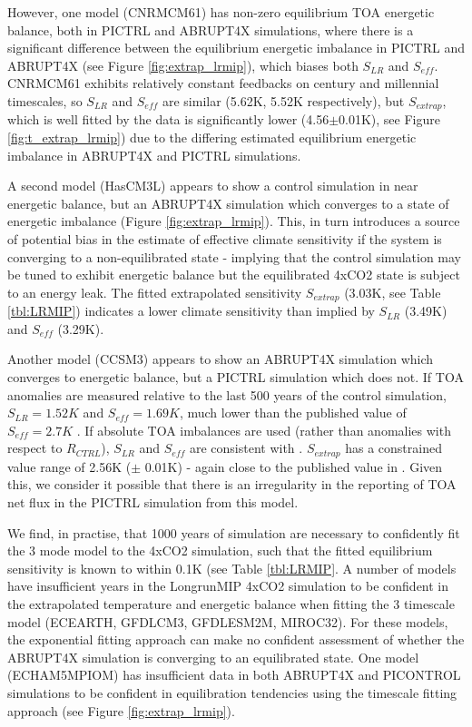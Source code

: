 \documentclass[esd, article]{copernicus}
\begin{document}
However, one model (CNRMCM61) has non-zero equilibrium TOA energetic balance, both in PICTRL and ABRUPT4X simulations, where there is a significant difference between the equilibrium energetic imbalance in PICTRL and ABRUPT4X (see Figure \ref{fig:extrap_lrmip}), which biases both $S_{LR}$ and $S_{eff}$.  CNRMCM61 exhibits relatively constant feedbacks on century and millennial timescales, so $S_{LR}$ and $S_{eff}$ are similar (5.62K, 5.52K respectively), but $S_{extrap}$, which is well fitted by the data is significantly lower (4.56$\pm$0.01K), see Figure \ref{fig:t_extrap_lrmip}) due to the differing estimated equilibrium energetic imbalance in ABRUPT4X and PICTRL simulations.  

A second model (HasCM3L) appears to show a control simulation in near energetic balance, but an ABRUPT4X simulation which converges to a state of energetic imbalance (Figure \ref{fig:extrap_lrmip}).  This, in turn introduces a source of potential bias in the estimate of effective climate sensitivity if the system is converging to a non-equilibrated state - implying that the control simulation may be tuned to exhibit energetic balance but the equilibrated 4xCO2 state is subject to an energy leak.  The fitted extrapolated sensitivity $S_{extrap}$ (3.03K, see Table \ref{tbl:LRMIP}) indicates a lower climate sensitivity than implied by $S_{LR}$ (3.49K) and $S_{eff}$ (3.29K).

Another model (CCSM3) appears to show an ABRUPT4X simulation which converges to energetic balance, but a PICTRL simulation which does not.  If TOA anomalies are measured relative to the last 500 years of the control simulation, $S_{LR}=1.52K$ and $S_{eff}=1.69K$, much lower than the published value of $S_{eff}=2.7K$ \citep{kiehl2006climate}.  If absolute TOA imbalances are used (rather than anomalies with respect to $R_{CTRL}$), $S_{LR}$ and $S_{eff}$  are consistent with \cite{kiehl2006climate}.  $S_{extrap}$ has a constrained value range of 2.56K ($\pm$ 0.01K) - again close to the published value in \cite{kiehl2006climate}.  Given this, we consider it possible that there is an irregularity in the reporting of TOA net flux in the PICTRL simulation from this model.

We find, in practise, that 1000 years of simulation are necessary to confidently fit the 3 mode model to the 4xCO2 simulation, such that the fitted equilibrium sensitivity is known to within 0.1K (see Table \ref{tbl:LRMIP}. A number of models have insufficient years in the LongrunMIP 4xCO2 simulation to be confident in the extrapolated temperature and energetic balance when fitting the 3 timescale model (ECEARTH, GFDLCM3, GFDLESM2M, MIROC32).  For these models, the exponential fitting approach can make no confident assessment of whether the ABRUPT4X simulation is converging to an equilibrated state.  One model (ECHAM5MPIOM) has insufficient data in both ABRUPT4X and PICONTROL simulations to be confident in equilibration tendencies using the timescale fitting approach (see Figure \ref{fig:extrap_lrmip}).
\end{document}

